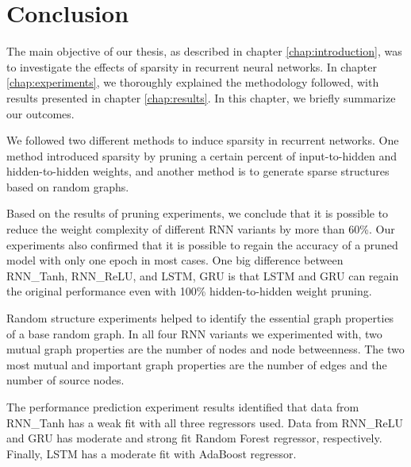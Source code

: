 \chapter{Conclusion}\label{chap:conclusion}

The main objective of our thesis, as described in chapter \ref{chap:introduction}, was to investigate the effects of sparsity in recurrent neural networks. In chapter \ref{chap:experiments}, we thoroughly explained the methodology followed, with results presented in chapter \ref{chap:results}. In this chapter, we briefly summarize our outcomes.

We followed two different methods to induce sparsity in recurrent networks. One method introduced sparsity by pruning a certain percent of input-to-hidden and hidden-to-hidden weights, and another method is to generate sparse structures based on random graphs.

Based on the results of pruning experiments, we conclude that it is possible to reduce the weight complexity of different RNN variants by more than 60\%. Our experiments also confirmed that it is possible to regain the accuracy of a pruned model with only one epoch in most cases. One big difference between RNN\_Tanh, RNN\_ReLU, and LSTM, GRU is that LSTM and GRU can regain the original performance even with 100\% hidden-to-hidden weight pruning.

Random structure experiments helped to identify the essential graph properties of a base random graph. In all four RNN variants we experimented with, two mutual graph properties are the number of nodes and node betweenness. The two most mutual and important graph properties are the number of edges and the number of source nodes.

The performance prediction experiment results identified that data from RNN\_Tanh has a weak fit with all three regressors used. Data from RNN\_ReLU and GRU has moderate and strong fit Random Forest regressor, respectively. Finally,  LSTM has a moderate fit with AdaBoost regressor.

